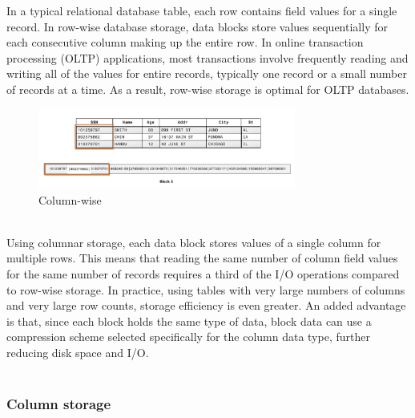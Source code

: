 \documentclass[10pt,a4paper]{article}
\newcommand{\nline}{\\~\\}
\begin{document}
In a typical relational database table, each row contains field values for a single record. In row-wise database storage, data blocks store values sequentially for each consecutive column making up the entire row. In online transaction processing (OLTP) applications, most transactions involve frequently reading and writing all of the values for entire records, typically one record or a small number of records at a time. As a result, row-wise storage is optimal for OLTP databases.
\begin{figure}[h!]
 \hfill \includegraphics[width=240pt]{images/columnar-vs-row2.png}\hspace*{\fill}
 \caption{Column-wise}
\end{figure}  \\
Using columnar storage, each data block stores values of a single column for multiple rows. This means that reading the same number of column field values for the same number of records requires a third of the I/O operations compared to row-wise storage. In practice, using tables with very large numbers of columns and very large row counts, storage efficiency is even greater. An added advantage is that, since each block holds the same type of data, block data can use a compression scheme selected specifically for the column data type, further reducing disk space and I/O.
\nline
\subsubsection{Column storage}
\end{document}
